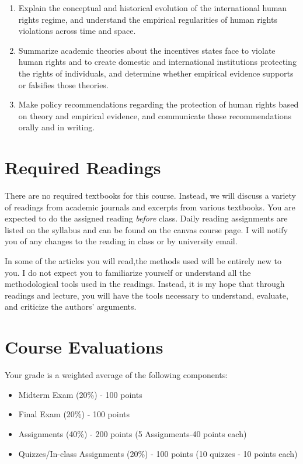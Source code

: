 \documentclass[11pt,]{article}
\providecommand{\tightlist}{%
  \setlength{\itemsep}{0pt}\setlength{\parskip}{0pt}}
\begin{document}
\begin{enumerate}
\def\labelenumi{\arabic{enumi}.}
\item
  Explain the conceptual and historical evolution of the international
  human rights regime, and understand the empirical regularities of
  human rights violations across time and space.
\item
  Summarize academic theories about the incentives states face to
  violate human rights and to create domestic and international
  institutions protecting the rights of individuals, and determine
  whether empirical evidence supports or falsifies those theories.
\item
  Make policy recommendations regarding the protection of human rights
  based on theory and empirical evidence, and communicate those
  recommendations orally and in writing.
\end{enumerate}

\hypertarget{required-readings}{%
\section{Required Readings}\label{required-readings}}

There are no required textbooks for this course. Instead, we will
discuss a variety of readings from academic journals and excerpts from
various textbooks. You are expected to do the assigned reading
\emph{before} class. Daily reading assignments are listed on the
syllabus and can be found on the canvas course page. I will notify you
of any changes to the reading in class or by university email.

In some of the articles you will read,the methods used will be entirely
new to you. I do not expect you to familiarize yourself or understand
all the methodological tools used in the readings. Instead, it is my
hope that through readings and lecture, you will have the tools
necessary to understand, evaluate, and criticize the authors' arguments.

\hypertarget{course-evaluations}{%
\section{Course Evaluations}\label{course-evaluations}}

Your grade is a weighted average of the following components:

\begin{itemize}
\tightlist
\item
  Midterm Exam (20\%) - 100 points
\item
  Final Exam (20\%) - 100 points
\item
  Assignments (40\%) - 200 points (5 Assignments-40 points each)
\item
  Quizzes/In-class Assignments (20\%) - 100 points (10 quizzes - 10
  points each)
\end{itemize}
\end{document}
